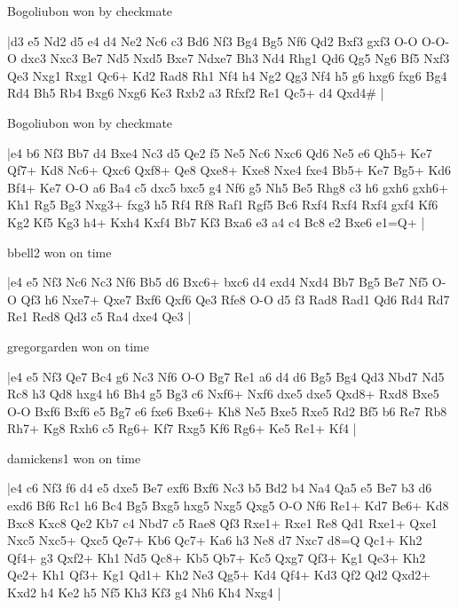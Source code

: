 \showboard

Bogoliubon won by checkmate

\makegametitle
|d3 e5 Nd2 d5 e4 d4 Ne2 Nc6 c3 Bd6 Nf3 Bg4 Bg5 Nf6 Qd2 Bxf3 gxf3 O-O O-O-O dxc3 Nxc3 Be7 Nd5 Nxd5 Bxe7 Ndxe7 Bh3 Nd4 Rhg1 Qd6 Qg5 Ng6 Bf5 Nxf3 Qe3 Nxg1 Rxg1 Qc6+ Kd2 Rad8 Rh1 Nf4 h4 Ng2 Qg3 Nf4 h5 g6 hxg6 fxg6 Bg4 Rd4 Bh5 Rb4 Bxg6 Nxg6 Ke3 Rxb2 a3 Rfxf2 Re1 Qc5+ d4 Qxd4\#  |

\showboard

Bogoliubon won by checkmate

\makegametitle
|e4 b6 Nf3 Bb7 d4 Bxe4 Nc3 d5 Qe2 f5 Ne5 Nc6 Nxc6 Qd6 Ne5 e6 Qh5+ Ke7 Qf7+ Kd8 Nc6+ Qxc6 Qxf8+ Qe8 Qxe8+ Kxe8 Nxe4 fxe4 Bb5+ Ke7 Bg5+ Kd6 Bf4+ Ke7 O-O a6 Ba4 c5 dxc5 bxc5 g4 Nf6 g5 Nh5 Be5 Rhg8 c3 h6 gxh6 gxh6+ Kh1 Rg5 Bg3 Nxg3+ fxg3 h5 Rf4 Rf8 Raf1 Rgf5 Bc6 Rxf4 Rxf4 Rxf4 gxf4 Kf6 Kg2 Kf5 Kg3 h4+ Kxh4 Kxf4 Bb7 Kf3 Bxa6 e3 a4 c4 Bc8 e2 Bxe6 e1=Q+  |

\showboard

bbell2 won on time

\makegametitle
|e4 e5 Nf3 Nc6 Nc3 Nf6 Bb5 d6 Bxc6+ bxc6 d4 exd4 Nxd4 Bb7 Bg5 Be7 Nf5 O-O Qf3 h6 Nxe7+ Qxe7 Bxf6 Qxf6 Qe3 Rfe8 O-O d5 f3 Rad8 Rad1 Qd6 Rd4 Rd7 Re1 Red8 Qd3 c5 Ra4 dxe4 Qe3  |

\showboard

gregorgarden won on time

\makegametitle
|e4 e5 Nf3 Qe7 Bc4 g6 Nc3 Nf6 O-O Bg7 Re1 a6 d4 d6 Bg5 Bg4 Qd3 Nbd7 Nd5 Rc8 h3 Qd8 hxg4 h6 Bh4 g5 Bg3 c6 Nxf6+ Nxf6 dxe5 dxe5 Qxd8+ Rxd8 Bxe5 O-O Bxf6 Bxf6 e5 Bg7 e6 fxe6 Bxe6+ Kh8 Ne5 Bxe5 Rxe5 Rd2 Bf5 b6 Re7 Rb8 Rh7+ Kg8 Rxh6 c5 Rg6+ Kf7 Rxg5 Kf6 Rg6+ Ke5 Re1+ Kf4  |

\showboard

damickens1 won on time

\makegametitle
|e4 c6 Nf3 f6 d4 e5 dxe5 Be7 exf6 Bxf6 Nc3 b5 Bd2 b4 Na4 Qa5 e5 Be7 b3 d6 exd6 Bf6 Rc1 h6 Bc4 Bg5 Bxg5 hxg5 Nxg5 Qxg5 O-O Nf6 Re1+ Kd7 Be6+ Kd8 Bxc8 Kxc8 Qe2 Kb7 c4 Nbd7 c5 Rae8 Qf3 Rxe1+ Rxe1 Re8 Qd1 Rxe1+ Qxe1 Nxc5 Nxc5+ Qxc5 Qe7+ Kb6 Qc7+ Ka6 h3 Ne8 d7 Nxc7 d8=Q Qc1+ Kh2 Qf4+ g3 Qxf2+ Kh1 Nd5 Qc8+ Kb5 Qb7+ Kc5 Qxg7 Qf3+ Kg1 Qe3+ Kh2 Qe2+ Kh1 Qf3+ Kg1 Qd1+ Kh2 Ne3 Qg5+ Kd4 Qf4+ Kd3 Qf2 Qd2 Qxd2+ Kxd2 h4 Ke2 h5 Nf5 Kh3 Kf3 g4 Nh6 Kh4 Nxg4  |

